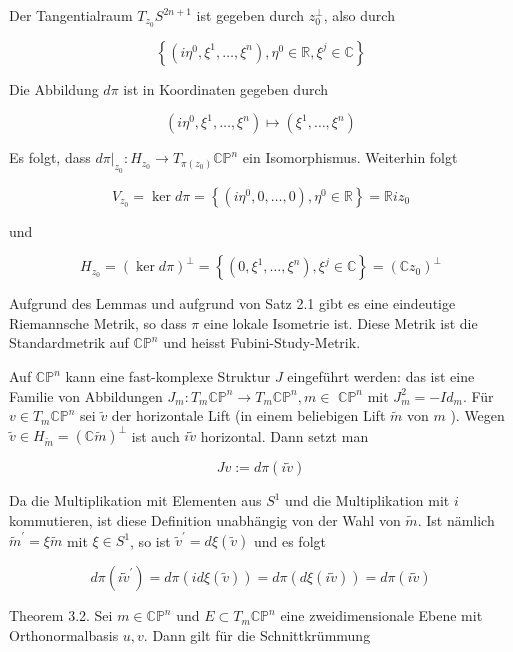 \documentclass[10pt, letterpaper]{article}
\begin{document}
Der Tangentialraum $T_{z_{0}} S^{2 n+1}$ ist gegeben durch $z_{0}^{\perp}$, also durch

$$
\left\{\left(i \eta^{0}, \xi^{1}, \ldots, \xi^{n}\right), \eta^{0} \in \mathbb{R}, \xi^{j} \in \mathbb{C}\right\}
$$

Die Abbildung $d \pi$ ist in Koordinaten gegeben durch

$$
\left(i \eta^{0}, \xi^{1}, \ldots, \xi^{n}\right) \mapsto\left(\xi^{1}, \ldots, \xi^{n}\right)
$$

Es folgt, dass $\left.d \pi\right|_{z_{0}}: H_{z_{0}} \rightarrow T_{\pi\left(z_{0}\right)} \mathbb{C} \mathbb{P}^{n}$ ein Isomorphismus. Weiterhin folgt

$$
V_{z_{0}}=\operatorname{ker} d \pi=\left\{\left(i \eta^{0}, 0, \ldots, 0\right), \eta^{0} \in \mathbb{R}\right\}=\mathbb{R} i z_{0}
$$

und

$$
H_{z_{0}}=(\operatorname{ker} d \pi)^{\perp}=\left\{\left(0, \xi^{1}, \ldots, \xi^{n}\right), \xi^{j} \in \mathbb{C}\right\}=\left(\mathbb{C} z_{0}\right)^{\perp}
$$

Aufgrund des Lemmas und aufgrund von Satz 2.1 gibt es eine eindeutige Riemannsche Metrik, so dass $\pi$ eine lokale Isometrie ist. Diese Metrik ist die Standardmetrik auf $\mathbb{C P}^{n}$ und heisst Fubini-Study-Metrik.

Auf $\mathbb{C P}^{n}$ kann eine fast-komplexe Struktur $J$ eingeführt werden: das ist eine Familie von Abbildungen $J_{m}: T_{m} \mathbb{C P}^{n} \rightarrow T_{m} \mathbb{C P}^{n}, m \in$ $\mathbb{C P}^{n}$ mit $J_{m}^{2}=-I d_{m}$. Für $v \in T_{m} \mathbb{C P}^{n}$ sei $\tilde{v}$ der horizontale Lift (in einem beliebigen Lift $\tilde{m}$ von $m$ ). Wegen $\tilde{v} \in H_{\tilde{m}}=(\mathbb{C} \tilde{m})^{\perp}$ ist auch $i \tilde{v}$ horizontal. Dann setzt man

$$
J v:=d \pi(i \tilde{v})
$$

Da die Multiplikation mit Elementen aus $S^{1}$ und die Multiplikation mit $i$ kommutieren, ist diese Definition unabhängig von der Wahl von $\tilde{m}$. Ist nämlich $\tilde{m}^{\prime}=\xi \tilde{m}$ mit $\xi \in S^{1}$, so ist $\tilde{v}^{\prime}=d \xi(\tilde{v})$ und es folgt

$$
d \pi\left(i \tilde{v}^{\prime}\right)=d \pi(i d \xi(\tilde{v}))=d \pi(d \xi(i \tilde{v}))=d \pi(i \tilde{v})
$$

Theorem 3.2. Sei $m \in \mathbb{C P}^{n}$ und $E \subset T_{m} \mathbb{C P}^{n}$ eine zweidimensionale Ebene mit Orthonormalbasis $u, v$. Dann gilt für die Schnittkrümmung
\end{document}
